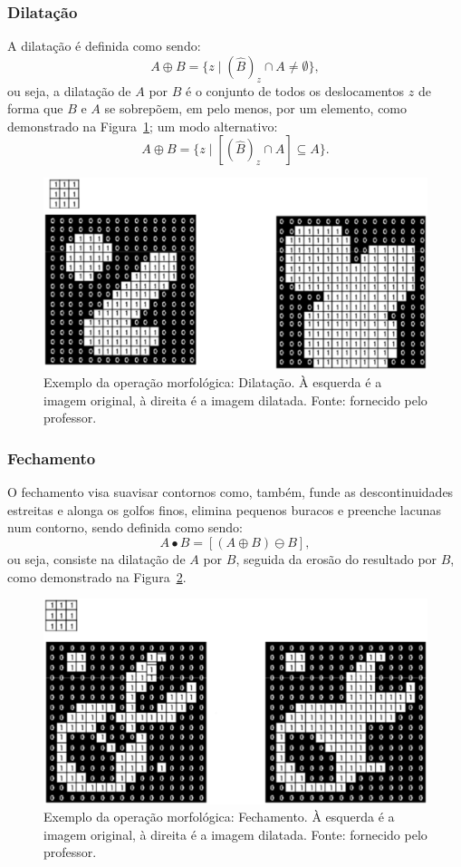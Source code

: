 \documentclass[conference]{Trabalho_Final}
\begin{document}
\subsubsection{Dilata\c{c}\~ao}
  \label{subsubsec:dilatacao}
A dilata\c{c}\~ao \'e definida como sendo:
$$ A \oplus B  = \{z \mid (\hat{B})_z \cap A \neq \emptyset \},$$
ou seja, a dilata\c{c}\~ao de $A$ por $B$ \'e o conjunto de todos os deslocamentos $z$ de forma que $B$ e $A$ se sobrep\~oem, em pelo menos, por um elemento, como demonstrado na Figura~\ref{fig:dilata}; um modo alternativo:
$$ A \oplus B  = \{z \mid [(\hat{B})_z \cap A] \subseteq A \}.$$

\begin{figure}[]
  \centering
  \includegraphics[width = 5 cm]{Dilatacao}
  \caption{Exemplo da opera\c{c}\~ao morfol\'ogica: Dilata\c{c}\~ao. \`A esquerda \'e a imagem original, \`a direita \'e a imagem dilatada. Fonte: fornecido pelo professor.}
  \label{fig:dilata}
\end{figure}

\subsubsection{Fechamento}
  \label{subsubsec:fechamento}
O fechamento visa suavisar contornos como, tamb\'em, funde as descontinuidades estreitas e alonga os golfos finos, elimina pequenos buracos e preenche lacunas num contorno, sendo definida como sendo:
$$ A \bullet B = [(A \oplus B) \ominus B],$$
ou seja, consiste na dilata\c{c}\~ao de $A$ por $B$, seguida da eros\~ao do resultado por $B$, como demonstrado na Figura~\ref{fig:fecha}.

\begin{figure}[!t]
  \centering
  \includegraphics[width = 5 cm]{Fechamento}
  \caption{Exemplo da opera\c{c}\~ao morfol\'ogica: Fechamento. \`A esquerda \'e a imagem original, \`a direita \'e a imagem dilatada. Fonte: fornecido pelo professor.}
  \label{fig:fecha}
\end{figure}
\end{document}
